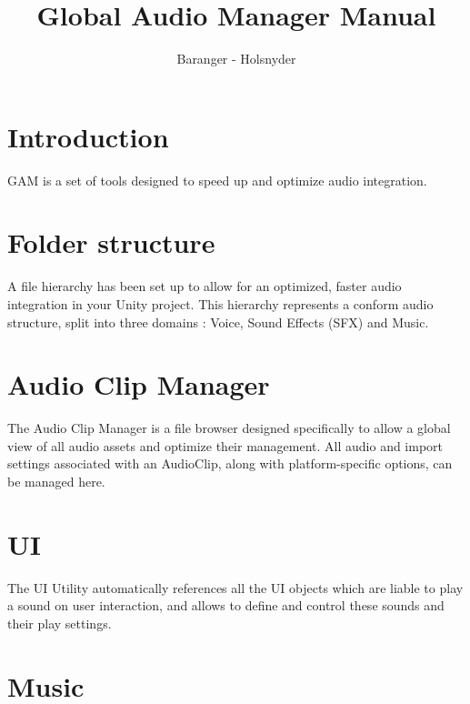 \documentclass[a4paper,10pt]{article}
\begin{document}
\title{Global Audio Manager Manual}
\author{Baranger - Holsnyder}
\maketitle

\clearpage


\tableofcontents %

\clearpage



\section*{Introduction}

GAM is a set of tools designed to speed up and optimize audio integration.

\section{Folder structure}

A file hierarchy has been set up to allow for an optimized, faster audio integration in your Unity project. This hierarchy represents a conform audio structure, split into three domains : Voice, Sound Effects (SFX) and Music. %


\section{Audio Clip Manager}

The Audio Clip Manager is a file browser designed specifically to allow a global view of all audio assets and optimize their management. All audio and import settings associated with an AudioClip, along with platform-specific options, can be managed here.


\section{UI}

The UI Utility automatically references all the UI objects which are liable to play a sound on user interaction, and allows to define and control these sounds and their play settings.


\section{Music}
\end{document}

